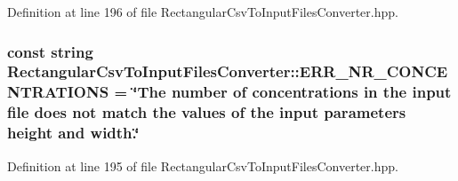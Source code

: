 \-Definition at line 196 of file \-Rectangular\-Csv\-To\-Input\-Files\-Converter.\-hpp.

\hypertarget{classmultiscale_1_1video_1_1RectangularCsvToInputFilesConverter_a537517f861e68fc2df30dcb13c3b9a5d}{
\subsubsection[{\-E\-R\-R\-\_\-\-N\-R\-\_\-\-C\-O\-N\-C\-E\-N\-T\-R\-A\-T\-I\-O\-N\-S}]{\setlength{\rightskip}{0pt plus 5cm}const string {\bf \-Rectangular\-Csv\-To\-Input\-Files\-Converter\-::\-E\-R\-R\-\_\-\-N\-R\-\_\-\-C\-O\-N\-C\-E\-N\-T\-R\-A\-T\-I\-O\-N\-S} = \char`\"{}\-The number of concentrations in the input file does not match the values of the input parameters {\bf height} and width.\char`\"{}}}\label{classmultiscale_1_1video_1_1RectangularCsvToInputFilesConverter_a537517f861e68fc2df30dcb13c3b9a5d}


\-Definition at line 195 of file \-Rectangular\-Csv\-To\-Input\-Files\-Converter.\-hpp.

